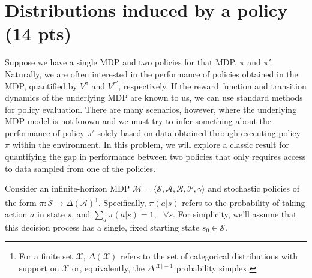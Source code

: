 \documentclass{article}
\begin{document}
\newpage
\section{Distributions induced by a policy (14 pts)}

Suppose we have a single MDP and two policies for that MDP, $\pi$ and $\pi'$. Naturally, we are often interested in the performance of policies obtained in the MDP, quantified by $V^{\pi}$ and $V^{\pi'}$, respectively. If the reward function and transition dynamics of the underlying MDP are known to us, we can use standard methods for policy evaluation. There are many scenarios, however, where the underlying MDP model is not known and we must try to infer something about the performance of policy $\pi'$ solely based on data obtained through executing policy $\pi$ within the environment. In this problem, we will explore a classic result for quantifying the gap in performance between two policies that only requires access to data sampled from one of the policies. 

Consider an infinite-horizon MDP $\mathcal{M} = \langle \mathcal{S}, \mathcal{A}, \mathcal{R}, \mathcal{P}, \gamma \rangle$ and stochastic policies of the form $\pi: \mathcal{S} \rightarrow \Delta(\mathcal{A})$\footnote{For a finite set $\mathcal{X}$, $\Delta(\mathcal{X})$ refers to the set of categorical distributions with support on $\mathcal{X}$ or, equivalently, the $\Delta^{|\mathcal{X}|-1}$ probability simplex.}. Specifically, $\pi(a|s)$ refers to the probability of taking action $a$ in state $s$, and $\sum_a \pi(a|s) = 1, \text{ } \forall s$. For simplicity, we'll assume that this decision process has a single, fixed starting state $s_{0} \in \mathcal{S}$. 
\end{document}
